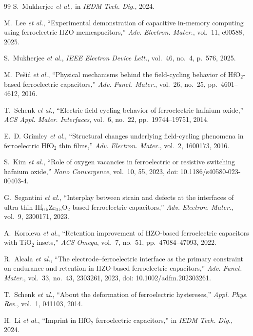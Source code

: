 \documentclass[journal]{IEEEtran}
\newcommand{\hzo}{Hf$_{0.5}$Zr$_{0.5}$O$_{2}$}
\begin{document}
\begin{thebibliography}{99}
S.~Mukherjee \emph{et al.},
in \emph{IEDM Tech. Dig.}, 2024.

M.~Lee \emph{et al.},
``Experimental demonstration of capacitive in-memory computing using
ferroelectric HZO memcapacitors,''
\emph{Adv. Electron. Mater.}, vol.~11, e00588, 2025.

S.~Mukherjee \emph{et al.},
\emph{IEEE Electron Device Lett.}, vol.~46, no.~4, p.~576, 2025.

M.~Pe\v{s}i\'c \emph{et al.},
``Physical mechanisms behind the field-cycling behavior of HfO$_2$-based
ferroelectric capacitors,'' \emph{Adv. Funct. Mater.}, vol.~26, no.~25,
pp.~4601--4612, 2016.

T.~Schenk \emph{et al.},
``Electric field cycling behavior of ferroelectric hafnium oxide,''
\emph{ACS Appl. Mater. Interfaces}, vol.~6, no.~22, pp.~19744--19751, 2014.

E.~D. Grimley \emph{et al.},
``Structural changes underlying field-cycling phenomena in ferroelectric
HfO$_2$ thin films,'' \emph{Adv. Electron. Mater.}, vol.~2, 1600173, 2016.

S.~Kim \emph{et al.},
``Role of oxygen vacancies in ferroelectric or resistive switching hafnium
oxide,'' \emph{Nano Convergence}, vol.~10, 55, 2023,
doi: 10.1186/s40580-023-00403-4.

G.~Segantini \emph{et al.},
``Interplay between strain and defects at the interfaces of ultra-thin
\hzo{}-based ferroelectric capacitors,''
\emph{Adv. Electron. Mater.}, vol.~9, 2300171, 2023.

A.~Koroleva \emph{et al.},
``Retention improvement of HZO-based ferroelectric capacitors with TiO$_2$
insets,'' \emph{ACS Omega}, vol.~7, no.~51, pp.~47084--47093, 2022.

R.~Alcala \emph{et al.},
``The electrode--ferroelectric interface as the primary constraint on
endurance and retention in HZO-based ferroelectric capacitors,''
\emph{Adv. Funct. Mater.}, vol.~33, no.~43, 2303261, 2023,
doi: 10.1002/adfm.202303261.

T.~Schenk \emph{et al.},
``About the deformation of ferroelectric hystereses,''
\emph{Appl. Phys. Rev.}, vol.~1, 041103, 2014.

H.~Li \emph{et al.},
``Imprint in HfO$_2$ ferroelectric capacitors,''
in \emph{IEDM Tech. Dig.}, 2024.


\end{thebibliography}
\end{document}
